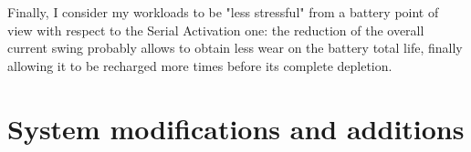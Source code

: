 \documentclass[a4paper]{article}
\begin{document}
        Finally, I consider my workloads to be "less stressful" from a battery point of view with respect to the Serial Activation one: the reduction of the overall current swing probably allows to obtain less wear on the battery total life, finally allowing it to be recharged more times before its complete depletion.

%                              
\section{System modifications and additions}
    
\end{document}
